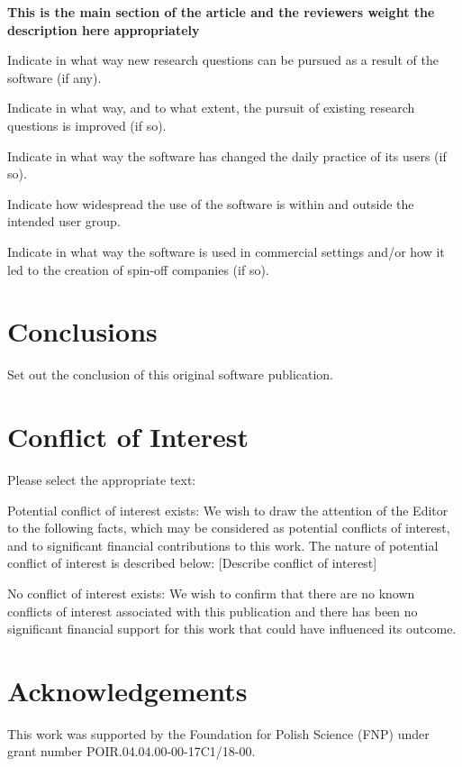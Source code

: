 \documentclass[preprint,12pt, a4paper]{elsarticle}
\newcommand{\1}{{\rm 1\hspace{-0.9mm}l}}
\begin{document}
\textbf{This is the main section of the article and the reviewers weight the 
description here appropriately}

Indicate in what way new research questions can be pursued as a result of the 
software (if any).

Indicate in what way, and to what extent, the pursuit of existing research 
questions is improved (if so).

Indicate in what way the software has changed the daily practice of its users 
(if so).

Indicate how widespread the use of the software is within and outside the 
intended user group.

Indicate in what way the software is used in commercial settings and/or how it 
led to the creation of spin-off companies (if so).

\section{Conclusions}
\label{}

Set out the conclusion of this original software publication.

\section{Conflict of Interest}
Please select the appropriate text:

Potential conflict of interest exists:
We wish to draw the attention of the Editor to the following facts, which may 
be considered as potential conflicts of interest, and to significant financial 
contributions to this work. The nature of potential conflict of interest is 
described below: [Describe conflict of interest]

No conflict of interest exists:
We wish to confirm that there are no known conflicts of interest associated 
with this publication and there has been no significant financial support for 
this work that could have influenced its outcome.


\section*{Acknowledgements}

This work was supported by the Foundation for Polish Science (FNP) under grant
number POIR.04.04.00-00-17C1/18-00.


 
\end{document}
